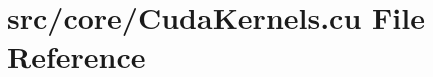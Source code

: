 \hypertarget{CudaKernels_8cu}{\section{src/core/\+Cuda\+Kernels.cu File Reference}
\label{CudaKernels_8cu}
}
